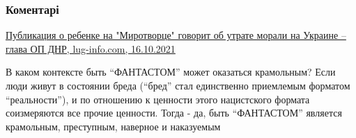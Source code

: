  
 
 
 
 
\subsubsection{Коментарі}

\begin{itemize} %
\href{https://lug-info.com/news/publikaciya-o-rebenke-na-mirotvorce-govorit-ob-utrate-morali-na-ukraine-glava-op-dnr}{%
Публикация о ребенке на "Миротворце" говорит об утрате морали на Украине – глава ОП ДНР, %
lug-info.com, 16.10.2021%
}



В каком контексте быть \enquote{ФАНТАСТОМ} может оказаться крамольным? Если люди живут
в состоянии бреда (\enquote{бред} стал единственно приемлемым форматом \enquote{реальности}), и
по отношению к ценности этого нацистского формата соизмеряются все прочие
ценности. Тогда - да, быть \enquote{ФАНТАСТОМ} является крамольным, преступным,
наверное и наказуемым

\end{itemize} %

